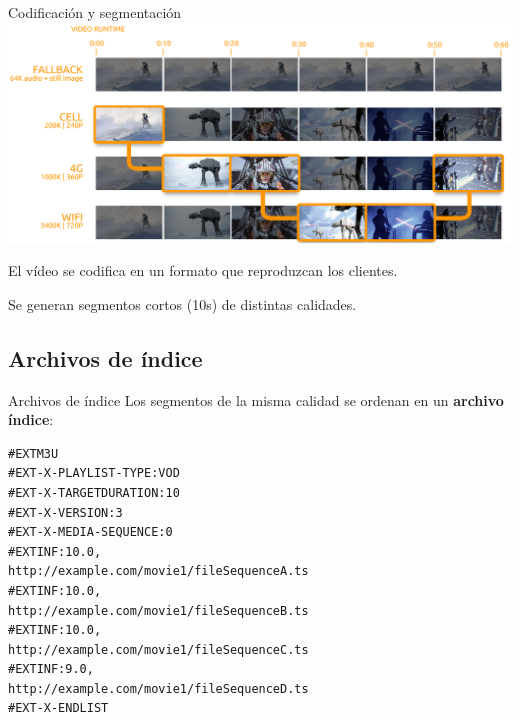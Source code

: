 \documentclass[10pt,compress,usetitleprogressbar,mathserif]{beamer}
\begin{document}
\begin{frame}{Codificación y segmentación}
  \includegraphics[scale=0.9]{img/timestamp.png}

  El vídeo se codifica en un formato que reproduzcan los clientes.

  Se generan segmentos cortos (10s) de distintas calidades.
\end{frame}

\subsection{Archivos de índice}

\begin{frame}[fragile]{Archivos de índice}
  Los segmentos de la misma calidad se ordenan en un \textbf{archivo índice}:

\begin{lstlisting}
#EXTM3U
#EXT-X-PLAYLIST-TYPE:VOD
#EXT-X-TARGETDURATION:10
#EXT-X-VERSION:3
#EXT-X-MEDIA-SEQUENCE:0
#EXTINF:10.0,
http://example.com/movie1/fileSequenceA.ts
#EXTINF:10.0,
http://example.com/movie1/fileSequenceB.ts
#EXTINF:10.0,
http://example.com/movie1/fileSequenceC.ts
#EXTINF:9.0,
http://example.com/movie1/fileSequenceD.ts
#EXT-X-ENDLIST
\end{lstlisting}
\end{frame}
\end{document}
